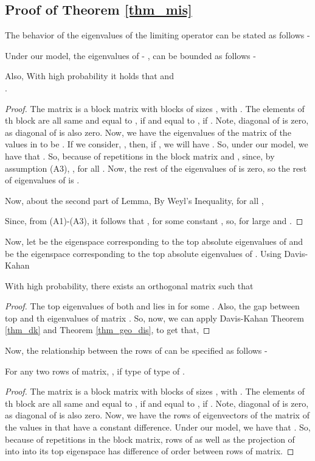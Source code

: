 \documentclass[graybox]{svmult}
\begin{document}
\subsection{Proof of Theorem \ref{thm_mis}} 
\label{sec_proof_thm}
The behavior of the eigenvalues of the limiting operator  can be stated as follows -
\begin{lemma}
Under our model, the eigenvalues of  - , can be bounded as follows -



Also, With high probability it holds that  and \\ 
.
\end{lemma} 
\begin{proof}
The matrix  is a block matrix with blocks of sizes , with . The elements of th block are all same and equal to , if  and equal to , if . Note, diagonal of  is zero, as diagonal of  is also zero. Now, we have the eigenvalues of the  matrix of the values in  to be . If we consider, , then, if , we will have . So, under our model, we have that . So, because of repetitions in the block matrix  and , since, by assumption (A3), , for all . Now, the rest of the eigenvalues of  is zero, so the rest of eigenvalues of  is .


Now, about the second part of Lemma, By Weyl's Inequality, for all ,

Since, from (A1)-(A3), it follows that , for some constant , so,  for large  and .
\end{proof}
Now, let  be the eigenspace corresponding to the top  absolute eigenvalues of  and  be the eigenspace corresponding to the top  absolute eigenvalues of . Using Davis-Kahan
\begin{lemma}
\label{lm_eigsp}
With high probability, there exists an orthogonal matrix  such that 
\end{lemma}
\begin{proof}
The top  eigenvalues of both  and  lies in  for some . Also, the gap  between top  and th eigenvalues of matrix . So, now, we can apply Davis-Kahan Theorem \ref{thm_dk} and Theorem \ref{thm_geo_dis}, to get that,
 
\end{proof}

Now, the relationship between the rows of  can be specified as follows -
\begin{lemma}
\label{lm_rows}
For any two rows  of  matrix, , if type of  type of .
\end{lemma} 
\begin{proof}
The matrix  is a block matrix with blocks of sizes , with . The elements of th block are all same and equal to , if  and equal to , if . Note, diagonal of  is zero, as diagonal of  is also zero. Now, we have the rows of eigenvectors of the  matrix of the values in  that have a constant difference. Under our model, we have that . So, because of repetitions in the block matrix, rows of  as well as the projection of  into into its top  eigenspace has difference of order  between rows of matrix. 
\end{proof}
\end{document}

